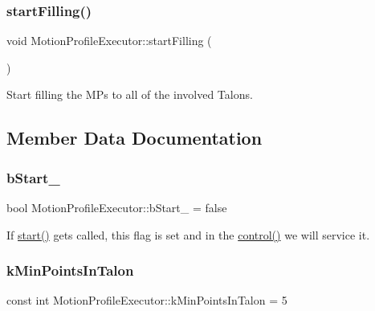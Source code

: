 \subsubsection{\texorpdfstring{start\+Filling()}{startFilling()}}
{\footnotesize\ttfamily void Motion\+Profile\+Executor\+::start\+Filling (\begin{DoxyParamCaption}{ }\end{DoxyParamCaption})\hspace{0.3cm}{\ttfamily [inline]}}

Start filling the M\+Ps to all of the involved Talons. 

\subsection{Member Data Documentation}
\mbox{\label{class_motion_profile_executor_a60632854bbae77815fbafa3b8c1450e7}} 
\subsubsection{\texorpdfstring{b\+Start\+\_\+}{bStart\_}}
{\footnotesize\ttfamily bool Motion\+Profile\+Executor\+::b\+Start\+\_\+ = false}

If \hyperlink{class_motion_profile_executor_a49d7debb97c9c722ee8fc2f6d43d21ca}{start()} gets called, this flag is set and in the \hyperlink{class_motion_profile_executor_a60a8d4ab5b168b31e75619b2a3683a78}{control()} we will service it. \mbox{\label{class_motion_profile_executor_ab2cd2c282d2c57e61847f3b0baaf6663}} 
\subsubsection{\texorpdfstring{k\+Min\+Points\+In\+Talon}{kMinPointsInTalon}}
{\footnotesize\ttfamily const int Motion\+Profile\+Executor\+::k\+Min\+Points\+In\+Talon = 5\hspace{0.3cm}{\ttfamily [static]}}

